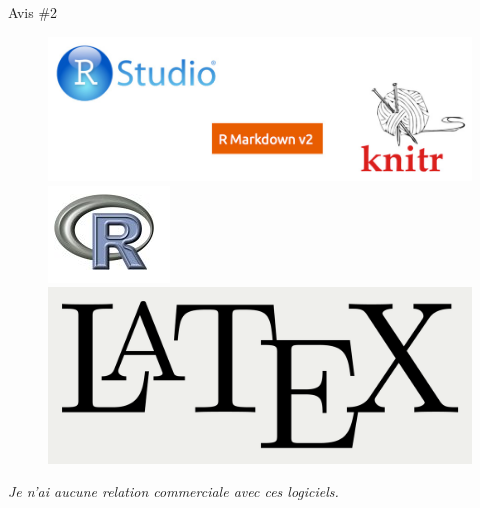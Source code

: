 \documentclass[10pt]{beamer}\usepackage[]{graphicx}\usepackage[]{color}
\begin{document}
\begin{frame}{Avis \#2}
\begin{figure}
\includegraphics[width=1.0\columnwidth]{rstudio.png}\\[5mm]
\includegraphics[width=0.2\columnwidth]{rlogo.png}\\[5mm]
\includegraphics[width=0.2\columnwidth]{LaTeX_logo.png}
\end{figure}

\textit{Je n'ai aucune relation commerciale avec ces logiciels.}

\end{frame}
\end{document}
